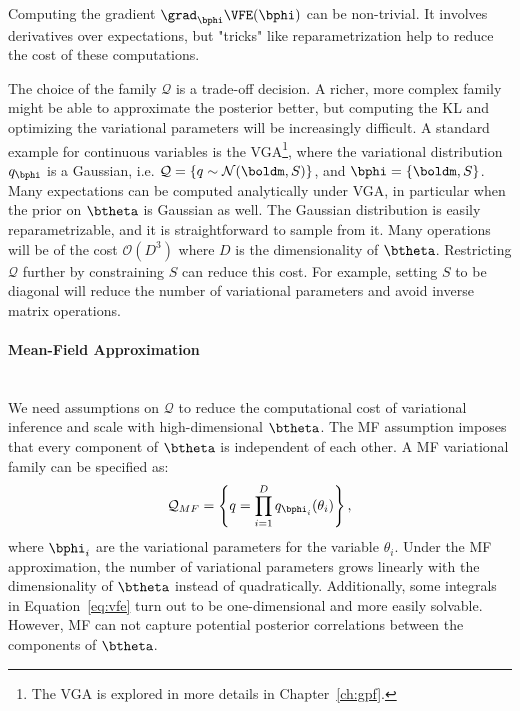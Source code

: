 Computing the gradient $\grad_{\bphi}\VFE(\bphi)$ can be non-trivial.
It involves derivatives over expectations, but "tricks" like reparametrization \cite{titsiasDoublyStochasticVariational} help to reduce the cost of these computations.

The choice of the family $\mathcal{Q}$ is a trade-off decision.
A richer, more complex family might be able to approximate the posterior better, but computing the \ac{KL} and optimizing the variational parameters will be increasingly difficult.
A standard example for continuous variables is the \ac{VGA}\footnote{The \ac{VGA} is explored in more details in Chapter~\ref{ch:gpf}.}, where the variational distribution $q_{\bphi}$ is a Gaussian, i.e. $\mathcal{Q} = \left\{q \sim \mathcal{N}(\boldm, S)\right\}$, and $\bphi = \{\boldm, S\}$.
Many expectations can be computed analytically under \ac{VGA}, in particular when the prior on $\btheta$ is Gaussian as well.
The Gaussian distribution is easily reparametrizable, and it is straightforward to sample from it.
Many operations will be of the cost $\mathcal{O}(D^3)$ where $D$ is the dimensionality of $\btheta$.
Restricting $\mathcal{Q}$ further by constraining $S$ can reduce this cost.
For example, setting $S$ to be diagonal will reduce the number of variational parameters and avoid inverse matrix operations.

\paragraph{Mean-Field Approximation}\mbox{}\\
We need assumptions on $\mathcal{Q}$ to reduce the computational cost of variational inference and scale with high-dimensional $\btheta$.
The \ac{MF} assumption imposes that every component of $\btheta$ is independent of each other.
A \ac{MF} variational family can be specified as:
\begin{align}
    \mathcal{Q}_{MF}= \left\{q = \prod_{i=1}^D q_{\bphi_i}(\theta_i)\right\},
\end{align}
where $\bphi_i$ are the variational parameters for the variable $\theta_i$.
Under the \ac{MF} approximation, the number of variational parameters grows linearly with the dimensionality of $\btheta$ instead of quadratically.
Additionally, some integrals in Equation~\ref{eq:vfe} turn out to be one-dimensional and more easily solvable.
However, \ac{MF} can not capture potential posterior correlations between the components of $\btheta$.

